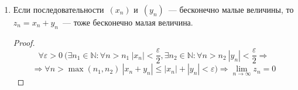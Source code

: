 \begin{enumerate}
	\item Если последовательности~$(x_n)$ и~$(y_n)$~--- бесконечно малые величины, то $z_n = x_n + y_n$~--- тоже бесконечно малая величина.
	\begin{proof}
	\begin{equation*}
	\forall \varepsilon > 0 \ (\exists n_1 \in \mathbb N \colon \forall n > n_1 \ |x_n| < \frac\varepsilon2, \exists n_2 \in \mathbb N \colon \forall n > n_2 \ |y_n| < \frac\varepsilon2 \Rightarrow
	\end{equation*}
	\begin{equation*}
	\Rightarrow \forall n > \max(n_1, n_2) \ |x_n + y_n| \leqslant |x_n| + |y_n| < \varepsilon) \Rightarrow \lim_{n \to \infty} z_n = 0
	\end{equation*}
	\end{proof}
\end{enumerate}